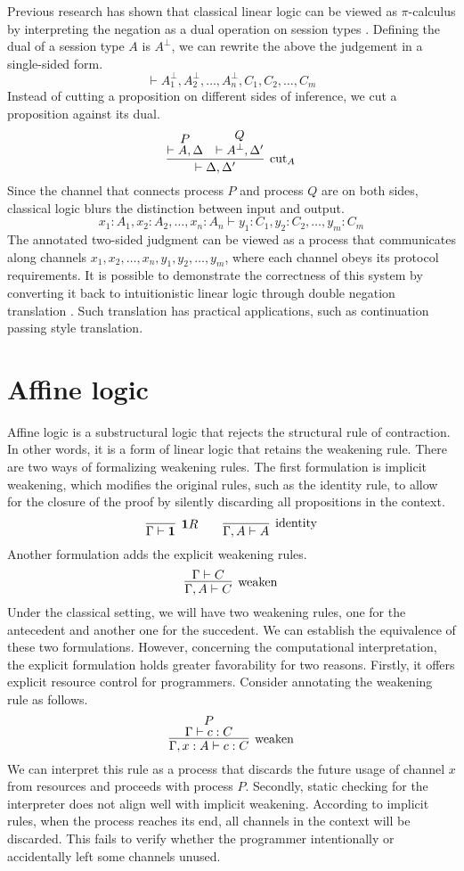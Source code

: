 \documentclass[12pt]{memoir}
\begin{document}
Previous research has shown that classical linear logic can be viewed as $\pi$-calculus
by interpreting the negation as a dual operation on session types \citep{Wadler2012}. 
Defining the dual of a session type $A$ is $A^{\bot}$, we can rewrite the above the judgement in a single-sided form.
\[
  \vdash A_1^\bot, A_2^\bot, \ldots, A_n^\bot, C_1, C_2, \ldots, C_m
\]
Instead of cutting a proposition on different sides of inference, we cut a proposition against its dual.
\[
  \infer[\text{cut}_A]{\vdash \Delta, \Delta'}{
    \deduce{\vdash A, \Delta}{P}
    &
    \deduce{\vdash A^\bot, \Delta'}{Q}
  }
\]
Since the channel that connects process $P$ and process $Q$ are on both sides, classical logic blurs the distinction between input and output.
\[
  x_1 : A_1, x_2 : A_2, \ldots, x_n : A_n \vdash y_1 : C_1, y_2 : C_2, \ldots, y_m : C_m
\]
The annotated two-sided judgment can be viewed as a process that communicates along channels $x_1, x_2, \ldots, x_n, y_1, y_2, \ldots, y_m$, where each channel obeys its protocol requirements.
It is possible to demonstrate the correctness of this system by converting it back to intuitionistic linear logic through double negation translation \citep{Friedman1978}.
Such translation has practical applications, such as continuation passing style translation.

\clearpage

\section{Affine logic}
Affine logic is a substructural logic that rejects the structural rule of contraction. 
In other words, it is a form of linear logic that retains the weakening rule. 
There are two ways of formalizing weakening rules. 
The first formulation is implicit weakening, which modifies the original rules, 
such as the identity rule, to allow for the closure of the proof by silently discarding all propositions in the context.
\[
  \infer[\textbf{1}R]{\Gamma \vdash \textbf{1}}{}
  \qquad
  \infer[\text{identity}]{\Gamma, A \vdash A}{}
\]
Another formulation adds the explicit weakening rules.
\[
  \infer[\text{weaken}]{\Gamma, A \vdash C}{\Gamma \vdash C}
\]
Under the classical setting, we will have two weakening rules, one for the antecedent and another one for the succedent.
We can establish the equivalence of these two formulations. 
However, concerning the computational interpretation, the explicit formulation holds greater favorability for two reasons.
Firstly, it offers explicit resource control for programmers. 
Consider annotating the weakening rule as follows.
\[
  \infer[\text{weaken}]{\Gamma, x : A \vdash c : C}{
    \deduce{\Gamma \vdash c : C}{P}
  }
\]
We can interpret this rule as a process that discards the future usage of channel $x$ from resources and proceeds with process $P$. 
Secondly, static checking for the interpreter does not align well with implicit weakening. 
According to implicit rules, when the process reaches its end, all channels in the context will be discarded. 
This fails to verify whether the programmer intentionally or accidentally left some channels unused.
\clearpage
\end{document}
